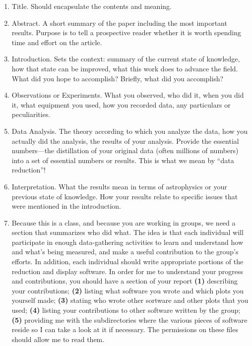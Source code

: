 \documentclass[12pt,preprint]{aastex}
\begin{document}
\begin{enumerate}

\item Title. Should encapsulate the contents and meaning.

\item Abstract. A short summary of the paper including the most important
  results.  Purpose is to tell a prospective reader whether it is worth
  spending time and effort on the article.
  
\item Introduction. Sets the context: summary of the current state of
  knowledge, how that state can be improved, what this work does to
  advance the field. What did you hope to accomplish? Briefly, what did you
  accomplish? 

\item Observations or Experiments. What you observed, who did it, when you
  did it, what equipment you used, how you recorded data, any particulars
  or peculiarities.

\item Data Analysis. The theory according to which you analyze the data,
  how you actually did the analysis, the results of your analysis. Provide
  the essential numbers---the distillation of your original data (often
  millions of numbers) into a set of essential numbers or results. This is
  what we mean by ``data reduction''!

\item Interpretation. What the results mean in terms of astrophysics or
  your previous state of knowledge. How your results relate to specific
  issues that were mentioned in the introduction.

\item Because this is a class, and because you are working in groups, we
  need a section that summarizes who did what. The idea is that each
  individual will participate in enough data-gathering activities to
  learn and understand how and what's being measured, and make a useful
  contribution to the group's efforts. In addition, each individual
  should write appropriate portions of the reduction and display
  software. In order for me to understand your progress and
  contributions, you should have a section of your report {\bf (1)}
  describing your contributions; {\bf (2)} listing what software you
  wrote and which plots you yourself made; {\bf (3)} stating who wrote
  other sortware and other plots that you used; {\bf (4)} listing your
  contributions to other software written by the group; {\bf (5)}
  providing me with the subdirectories where the various pieces of
  software reside so I can take a look at it if necessary. The
  permissions on these files should allow me to read them.


\end{enumerate}
\end{document}

